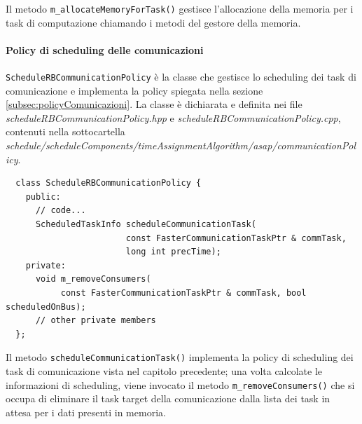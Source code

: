 Il metodo \verb+m_allocateMemoryForTask()+ gestisce l'allocazione della memoria 
per i task di computazione chiamando i metodi del gestore della memoria.

\paragraph{Policy di scheduling delle comunicazioni}
\verb+ScheduleRBCommunicationPolicy+ \`e la classe che gestisce lo scheduling dei task 
di comunicazione e implementa la policy spiegata nella sezione 
\ref{subsec:policyComunicazioni}. La classe è dichiarata e definita nei file 
\emph{scheduleRBCommunicationPolicy.hpp} e  \emph{scheduleRBCommunicationPolicy.cpp},
contenuti nella sottocartella  \emph{schedule/scheduleComponents/timeAssignmentAlgorithm/asap/communicationPolicy}.
\newline
\begin{verbatim}
  class ScheduleRBCommunicationPolicy {
    public:
      // code...
      ScheduledTaskInfo scheduleCommunicationTask(
                        const FasterCommunicationTaskPtr & commTask,
                        long int precTime);
    private:
      void m_removeConsumers(
           const FasterCommunicationTaskPtr & commTask, bool scheduledOnBus);
      // other private members
  };
\end{verbatim}

Il metodo \verb+scheduleCommunicationTask()+ implementa la policy di scheduling dei
task di comunicazione vista nel capitolo precedente; una volta calcolate le informazioni
di scheduling, viene invocato il metodo \verb+m_removeConsumers()+ che si occupa di
eliminare il task target della comunicazione dalla lista dei task in attesa per
i dati presenti in memoria.

